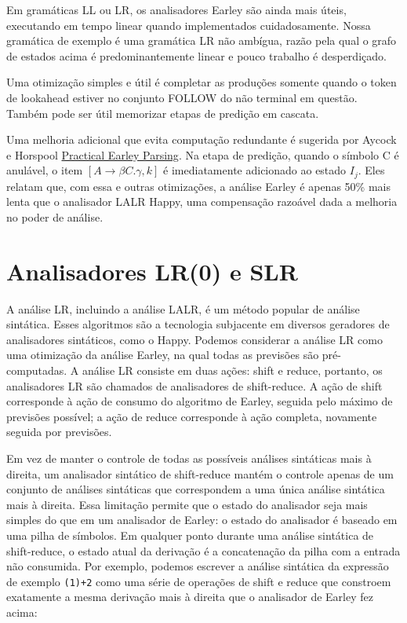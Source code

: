 Em gramáticas LL ou LR, os analisadores Earley são ainda mais úteis,
executando em tempo linear quando implementados cuidadosamente. Nossa
gramática de exemplo é uma gramática LR não ambígua, razão pela qual
o grafo de estados acima é predominantemente linear e pouco trabalho
é desperdiçado.

Uma otimização simples e útil é completar as produções somente quando
o token de lookahead estiver no conjunto FOLLOW do não terminal em
questão. Também pode ser útil memorizar etapas de predição em cascata.

Uma melhoria adicional que evita computação redundante é sugerida por
Aycock e Horspool
\href{https://academic.oup.com/comjnl/article-abstract/45/6/620/429185?redirectedFrom=PDF}{Practical
Earley Parsing}. Na etapa de predição, quando o símbolo C é anulável,
o item \([A\to \beta C.\gamma, k]\) é imediatamente adicionado ao
estado \(I_j\). Eles relatam que, com essa e outras otimizações, a
análise Earley é apenas 50\% mais lenta que o analisador LALR
Happy, uma compensação razoável dada a melhoria no poder de análise.

\section{Analisadores LR(0) e SLR}

A análise LR, incluindo a análise LALR, é um método popular de
análise sintática. Esses algoritmos são a tecnologia subjacente em
diversos geradores de analisadores sintáticos, como o Happy. Podemos
considerar a análise LR como uma otimização da análise Earley, na
qual todas as previsões são pré-computadas. A análise LR consiste em
duas ações: shift e reduce, portanto, os analisadores LR são chamados
de analisadores de shift-reduce. A ação de shift corresponde à ação
de consumo do algoritmo de Earley, seguida pelo máximo de previsões
possível; a ação de reduce corresponde à ação completa, novamente
seguida por previsões.

Em vez de manter o controle de todas as possíveis análises sintáticas
mais à direita, um analisador sintático de shift-reduce mantém o
controle apenas de um conjunto de análises sintáticas que
correspondem a uma única análise sintática mais à direita. Essa
limitação permite que o estado do analisador seja mais simples do que
em um analisador de Earley: o estado do analisador é baseado em uma
pilha de símbolos. Em qualquer ponto durante uma análise sintática de
shift-reduce, o estado atual da derivação é a concatenação da pilha
com a entrada não consumida. Por exemplo, podemos escrever a análise
sintática da expressão de exemplo \verb|(1)+2|
como uma série de operações de shift e reduce que constroem
exatamente a mesma derivação mais à direita que o analisador de
Earley fez acima:

